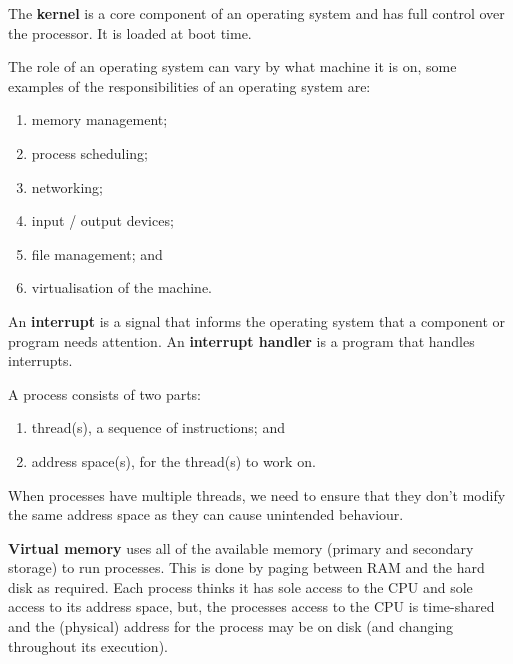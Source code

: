 \begin{definition}[Kernel]
    The \textbf{kernel} is a core component of an operating system and has full control over the processor. It is loaded at boot time. 
\end{definition}

\begin{example}
    The role of an operating system can vary by what machine it is on, some examples of the responsibilities of an operating system are:
    \begin{enumerate}
        \item memory management;
        \item process scheduling;
        \item networking;
        \item input / output devices;
        \item file management; and
        \item virtualisation of the machine.
    \end{enumerate}
\end{example}

\begin{definition}[Interrupt]
    An \textbf{interrupt} is a signal that informs the operating system that a component or program needs attention. An \textbf{interrupt handler} is a program that handles interrupts.
\end{definition}

\begin{definition}[Process]
    A process consists of two parts:
    \begin{enumerate}
        \item thread(s), a sequence of instructions; and
        \item address space(s), for the thread(s) to work on.
    \end{enumerate}
\end{definition}

When processes have multiple threads, we need to ensure that they don't modify the same address space as they can cause unintended behaviour.

\begin{definition}
    \textbf{Virtual memory} uses all of the available memory (primary and secondary storage) to run processes. This is done by paging between RAM and the hard disk as required. Each process thinks it has sole access to the CPU and sole access to its address space, but, the processes access to the CPU is time-shared and the (physical) address for the process may be on disk (and changing throughout its execution).
\end{definition}

